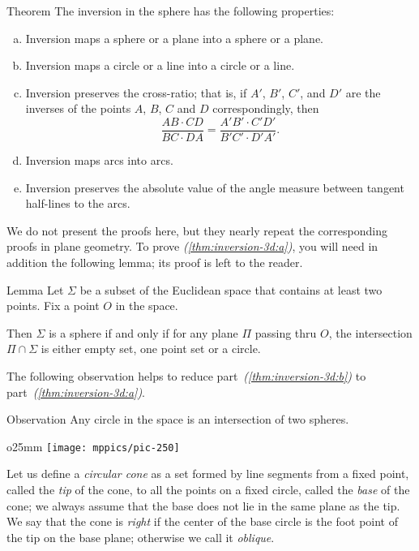 \begin{thm}{Theorem}\label{thm:inversion-3d}
The inversion in the sphere has the following properties:
\begin{enumerate}[(a)]
\item\label{thm:inversion-3d:a} Inversion maps a sphere or a plane into a sphere or a plane.
\item\label{thm:inversion-3d:b} Inversion maps a circle or a line into a circle or a line. 
\item\label{thm:inversion-3d:cross-ratio} Inversion preserves the cross-ratio;
that is, if $A'$, $B'$, $C'$, and $D'$ are the inverses of the points $A$, $B$, $C$ and $D$ correspondingly,
then
$$\frac{AB\cdot CD}{BC\cdot DA}= \frac{A'B'\cdot C'D'}{B'C'\cdot D'A'}.$$
\item Inversion maps arcs into arcs.
\item\label{thm:inversion-3d:angle} Inversion preserves the absolute value of the angle
measure between tangent half-lines to the arcs.
\end{enumerate}
\end{thm}


We do not present the proofs here, but
they nearly repeat the corresponding proofs in plane geometry.
To prove \textit{(\ref{thm:inversion-3d:a})}, you will need in addition the following lemma;
its proof is left to the reader.

\begin{thm}{Lemma}
Let $\Sigma$ be a subset of the Euclidean space
that contains at least two points.
Fix a point $O$ in the space.

Then $\Sigma$ is 
a sphere 
if and only if
for any plane $\Pi$ passing thru $O$,
the intersection $\Pi\cap \Sigma$ is either empty set,
one point set or a circle.
\end{thm}  

The following observation helps to reduce part~\textit{(\ref{thm:inversion-3d:b})} to part~\textit{(\ref{thm:inversion-3d:a})}.

\begin{thm}{Observation}
Any circle in the space is an intersection of two spheres.
\end{thm}

{

\begin{wrapfigure}{o}{25mm}
\centering
\texttt{[image: mppics/pic-250]}
\end{wrapfigure}

Let us define a \emph{circular cone} as a set formed by line segments from a fixed point, called the \emph{tip} of the cone, to all the points on a fixed circle, called the \emph{base} of the cone;
we always assume that the base does not lie in the same plane as the tip.
We say that the cone is \emph{right} 
if the center of the base circle is the foot point of the tip on the base plane;
otherwise we call it \emph{oblique}.

}

